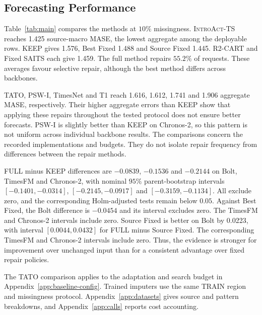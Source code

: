 \documentclass{article}
\newcommand{\introact}{\textsc{IntroAct-TS}}
\begin{document}
\subsection{Forecasting Performance}
\label{sec:exp-main}
Table~\ref{tab:main} compares the methods at $10\%$ missingness. \introact{} reaches
1.425 source-macro MASE, the lowest aggregate among the deployable rows. KEEP gives 1.576,
Best Fixed 1.488 and Source Fixed 1.445. R2-CART and Fixed SAITS each give 1.459.
The full method repairs $55.2\%$ of requests. These averages favour selective repair,
although the best method differs across backbones.

TATO, PSW-I, TimesNet and T1 reach 1.616, 1.612, 1.741 and 1.906 aggregate MASE,
respectively. Their higher aggregate errors than KEEP show that applying these repairs
throughout the tested protocol does not ensure better forecasts. PSW-I is slightly better
than KEEP on Chronos-2, so this pattern is not uniform across individual backbone results.
The comparisons concern the recorded implementations and budgets. They do not isolate
repair frequency from differences between the repair methods.

FULL minus KEEP differences are $-0.0839$, $-0.1536$ and $-0.2144$ on Bolt, TimesFM
and Chronos-2, with nominal $95\%$ parent-bootstrap intervals
$[-0.1401,-0.0314]$, $[-0.2145,-0.0917]$ and $[-0.3159,-0.1134]$.
All exclude zero, and the corresponding Holm-adjusted tests remain below $0.05$.
Against Best Fixed, the Bolt difference is $-0.0454$ and its interval excludes zero.
The TimesFM and Chronos-2 intervals include zero. Source Fixed is better on Bolt by
0.0223, with interval $[0.0044,0.0432]$ for FULL minus Source Fixed. The corresponding
TimesFM and Chronos-2 intervals include zero. Thus, the evidence is stronger for improvement
over unchanged input than for a consistent advantage over fixed repair policies.

The TATO comparison applies to the adaptation and search budget in Appendix~\ref{app:baseline-config}.
Trained imputers use the same TRAIN region and missingness protocol. Appendix~\ref{app:datasets}
gives source and pattern breakdowns, and Appendix~\ref{app:calls} reports cost accounting.
\end{document}
